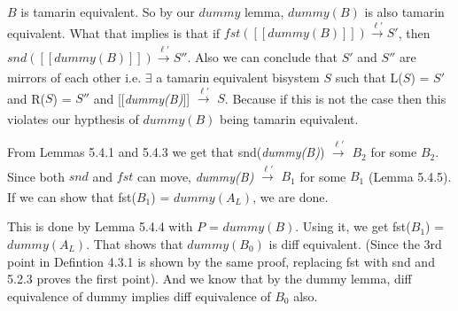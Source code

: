 \documentclass[11pt]{article}
\begin{document}
$B$ is tamarin equivalent. So by our $dummy$ lemma, $dummy(B)$ is also tamarin equivalent. What that implies is that if $fst([[dummy(B)]]) \xrightarrow[\text{}]{\text{$\ell'$}} S'$, then $snd([[dummy(B)]]) \xrightarrow[\text{}]{\text{$\ell'$}} S''$. Also we can conclude that $S'$ and $S''$ are mirrors of each other i.e. $\exists$ a tamarin equivalent bisystem $S$ such that L($S$) = $S'$ and R($S$) = $S''$ and [[{\it dummy(B)}]] {$\xrightarrow[\text{}]{\text{$\ell'$}}$} {\it $S$}. Because if this is not the case then this violates our hypthesis of $dummy(B)$ being tamarin equivalent.

From Lemmas 5.4.1 and 5.4.3 we get that snd({\it dummy(B)}) {$\xrightarrow[\text{}]{\text{$\ell'$}}$} {\it $B_2$} for some $B_2$. Since both $snd$ and $fst$ can move, {\it dummy(B)} {$\xrightarrow[\text{}]{\text{$\ell'$}}$} {\it $B_1$} for some $B_1$ (Lemma 5.4.5). If we can show that fst($B_1$) = $dummy(A_L)$, we are done. 

This is done by Lemma 5.4.4 with $P$ = $dummy(B)$. Using it, we get fst($B_1$) = $dummy(A_L)$. That shows that $dummy(B_0)$ is diff equivalent. (Since the 3rd point in Defintion 4.3.1 is shown by the same proof, replacing fst with snd and 5.2.3 proves the first point). And we know that by the dummy lemma, diff equivalence of dummy implies diff equivalence of $B_0$ also.
\end{document}
